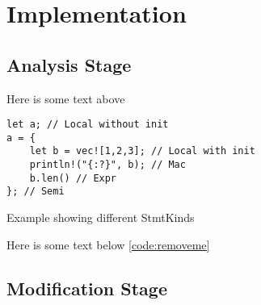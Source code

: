 \chapter{Implementation}
\section{Analysis Stage}

Here is some text above


\begin{code}
    \caption{}
\end{code}

\begin{code}
    \caption{}
\end{code}

\begin{code}
    \caption{}
\end{code}

\begin{code}
    \caption{}
\end{code}


\begin{code}
\begin{verbatim}
let a; // Local without init
a = {
    let b = vec![1,2,3]; // Local with init
    println!("{:?}", b); // Mac
    b.len() // Expr
}; // Semi
\end{verbatim}
\caption{Example showing different StmtKinds}
\end{code}


\begin{code}
    \caption{}
\end{code}

\begin{code}
    \caption{}
\end{code}

Here is some text below \autoref{code:removeme}

\section{Modification Stage}

